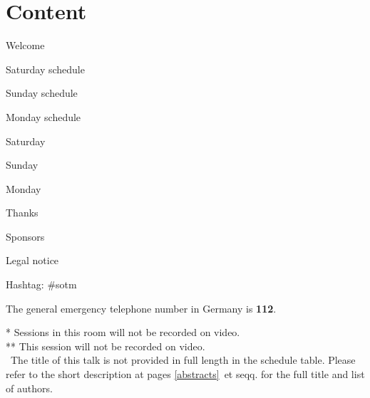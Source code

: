 \section*{Content}
\newlength\contentspace
\setlength\contentspace{\contentspace}

\vspace*{\contentspace}%
\noindent Welcome\dotfill \pageref{welcome}
%
%
%

\vspace*{\contentspace}%
\noindent Saturday schedule \dotfill \pageref{saturday}

\vspace*{\contentspace}%
\noindent Sunday schedule \dotfill \pageref{sunday}

\vspace*{\contentspace}%
\noindent Monday schedule \dotfill \pageref{monday}

\vspace*{\contentspace}%
\noindent Saturday \dotfill \pageref{saturday-descriptions}

\vspace*{\contentspace}%
\noindent Sunday \dotfill \pageref{sunday-descriptions}

\vspace*{\contentspace}%
\noindent Monday \dotfill \pageref{monday-descriptions}

\vspace*{\contentspace}%
\noindent Thanks \dotfill \pageref{thanks}

\vspace*{\contentspace}%
\noindent Sponsors \dotfill \pageref{sponsors}
%

\vspace*{\contentspace}%
\noindent Legal notice \dotfill \pageref{legal}

\vfill
\noindent
Hashtag: \#sotm

\vspace*{0.8em}%
\noindent
The general emergency telephone number in Germany is \textbf{112}.
\vfill

\small{
\noindent
  \** Sessions in this room will not be recorded on video.\\
  \**\** This session will not be recorded on video.\\
  \diamondSymbol\ The title of this talk is not provided in full length in the schedule table. Please refer to the short description at pages \ref{abstracts}~et seqq. for the full title and list of authors.
}\normalsize


\newpage
